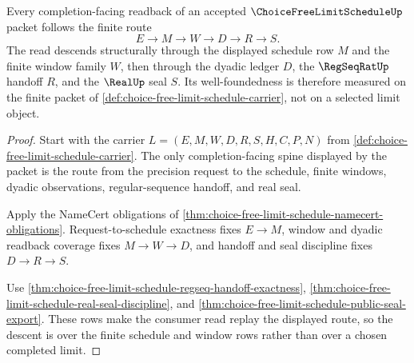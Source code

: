 \begin{theorem}
\label{thm:choice-free-limit-schedule-choice-free-well-founded-readback}
Every completion-facing readback of an accepted $\ChoiceFreeLimitScheduleUp$ packet follows the finite route
$$
E \to M \to W \to D \to R \to S.
$$
The read descends structurally through the displayed schedule row $M$ and the finite window family $W$, then through the dyadic ledger $D$, the $\RegSeqRatUp$ handoff $R$, and the $\RealUp$ seal $S$. Its well-foundedness is therefore measured on the finite packet of \autoref{def:choice-free-limit-schedule-carrier}, not on a selected limit object.
\end{theorem}
\begin{proof}
Start with the carrier $L=(E,M,W,D,R,S,H,C,P,N)$ from \autoref{def:choice-free-limit-schedule-carrier}. The only completion-facing spine displayed by the packet is the route from the precision request to the schedule, finite windows, dyadic observations, regular-sequence handoff, and real seal.

Apply the NameCert obligations of \autoref{thm:choice-free-limit-schedule-namecert-obligations}. Request-to-schedule exactness fixes $E \to M$, window and dyadic readback coverage fixes $M \to W \to D$, and handoff and seal discipline fixes $D \to R \to S$.

Use \autoref{thm:choice-free-limit-schedule-regseq-handoff-exactness}, \autoref{thm:choice-free-limit-schedule-real-seal-discipline}, and \autoref{thm:choice-free-limit-schedule-public-seal-export}. These rows make the consumer read replay the displayed route, so the descent is over the finite schedule and window rows rather than over a chosen completed limit.
\end{proof}

